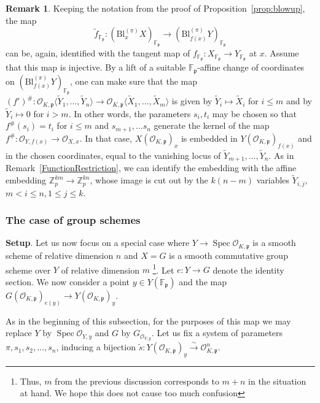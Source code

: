 \documentclass[11pt,oneside]{amsart}
\theoremstyle{plain}
\theoremstyle{definition}
\newtheorem{remark}[theorem]{Remark}
\DeclareMathOperator{\spec}{Spec} \DeclareMathOperator{\sgn}{sign}
\def\Z{\mathbb{Z}}
\def\F{\mathbb{F}}
\def\oh{\mathcal{O}}
\begin{document}
\begin{remark}\label{rem:InjectiveTangent}
Keeping the notation from the proof of Proposition~\ref{prop:blowup}, the map 
$$\tilde{f}_{\F_{\mathfrak{p}}}: (\mathrm{Bl}_x^{(\pi)} X)_{\F_{\mathfrak{p}}} \rightarrow (\mathrm{Bl}_{f(x)}^{(\pi)} Y)_{\F_{\mathfrak{p}}}$$ can be, again, identified with the tangent map of $f_{\F_{\mathfrak{p}}}:X_{\F_{\mathfrak{p}}} \rightarrow Y_{\F_{\mathfrak{p}}}$ at $x$. Assume that this map is injective. By a lift of a suitable $\F_{\mathfrak{p}}$-affine change of coordinates on $(\mathrm{Bl}_{f(x)}^{(\pi)} Y)_{\F_{\mathfrak{p}}}$, one can make sure that the map 
$(f')^{\#}:\oh_{K, \mathfrak{p}}\langle\tilde{Y}_1, \dots, \tilde{Y}_n\rangle\rightarrow \oh_{K, \mathfrak{p}}\langle\tilde{X}_1, \dots, \tilde{X}_m\rangle$ is given by $\tilde{Y}_i \mapsto \tilde{X}_i$ for $i\leq m$ and by $\tilde{Y}_i \mapsto 0$ for $i>m$. In other words, the parameters $s_i, t_i$ may be chosen so that $f^{\#}(s_i)=t_i$ for $i\leq m$ and $s_{m+1}, \dots s_n$ generate the kernel of the map $f^{\#}: \oh_{Y, f(x)}\rightarrow \oh_{X, x}$. In that case, $X(\oh_{K, \mathfrak{p}})_{x}$ is embedded in $Y(\oh_{K, \mathfrak{p}})_{f(x)}$ and in the chosen coordinates, equal to the vanishing locus of $\tilde{Y}_{m+1}, \dots, \tilde{Y}_{n}$. As in Remark~\ref{FunctionRestriction}, we can identify the embedding  with the affine embedding $\Z_p^{km}\rightarrow \Z_p^{kn}$, whose image is cut out by the $k(n-m)$ variables $\tilde{Y}_{i, j},$ $m < i \leq n, 1\leq j \leq k$. 
\end{remark}

\subsubsection{The case of group schemes} \indent

\noindent \textbf{Setup}. 
Let us now focus on a special case where $Y \rightarrow \spec\oh_{K, \mathfrak{p}}$ is a smooth scheme of relative dimension $n$ and  $X=G$ is a smooth commutative group scheme over $Y$ of relative dimension $m$ \footnote{Thus, $m$ from the previous discussion corresponds to $m+n$ in the situation at hand. We hope this does not cause too much confusion}. Let $e: Y \rightarrow G$ denote the identity section. We now consider a point $y \in Y(\F_{\mathfrak{p}})$ and the map $G(\oh_{K, \mathfrak{p}})_{e(y)}\rightarrow Y(\oh_{K, \mathfrak{p}})_{y}$.

As in the beginning of this subsection, for the purposes of this map we may replace $Y$ by $\spec{\oh_{Y, y}}$ and $G$ by $G_{\oh_{Y, y}}$. Let us fix a system of parameters $\pi, s_1, s_2, \dots, s_n$, inducing a bijection $\tilde{s}: Y(\oh_{K, \mathfrak{p}})_{y}\stackrel{\sim}{\rightarrow} \oh_{K, \mathfrak{p}}^n$.
\end{document}
